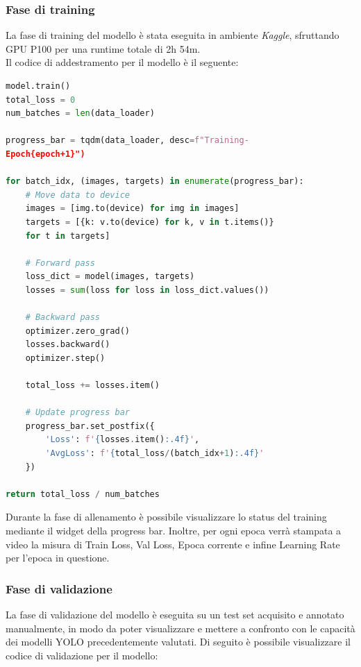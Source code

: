 \documentclass[12pt]{article}
\begin{document}
\subsubsection{Fase di training}
La fase di training del modello è stata eseguita in ambiente \textit{Kaggle}, sfruttando GPU P100 per una runtime totale di 2h 54m.\\
Il codice di addestramento per il modello è il seguente:
\begin{lstlisting}[language=Python, caption={Esempio di codice per il training del modello Resnet}, label={lst:train-resnet}]
model.train()
total_loss = 0
num_batches = len(data_loader)
    
progress_bar = tqdm(data_loader, desc=f"Training-
Epoch{epoch+1}")
    
for batch_idx, (images, targets) in enumerate(progress_bar):
    # Move data to device
    images = [img.to(device) for img in images]
    targets = [{k: v.to(device) for k, v in t.items()} 
    for t in targets]
        
    # Forward pass
    loss_dict = model(images, targets)
    losses = sum(loss for loss in loss_dict.values())
        
    # Backward pass
    optimizer.zero_grad()
    losses.backward()
    optimizer.step()
        
    total_loss += losses.item()
        
    # Update progress bar
    progress_bar.set_postfix({
        'Loss': f'{losses.item():.4f}',
        'AvgLoss': f'{total_loss/(batch_idx+1):.4f}'
    })
    
return total_loss / num_batches
\end{lstlisting}
Durante la fase di allenamento è possibile visualizzare lo status del training mediante il widget della progress bar. Inoltre, per ogni epoca verrà stampata a video la misura di Train Loss, Val Loss, Epoca corrente e infine Learning Rate per l'epoca in questione.

\subsubsection{Fase di validazione}
La fase di validazione del modello è  eseguita su un test set acquisito e annotato manualmente, in modo da poter visualizzare e mettere a confronto con le capacità dei modelli YOLO precedentemente valutati. Di seguito è possibile visualizzare il codice di validazione per il modello:
\end{document}
